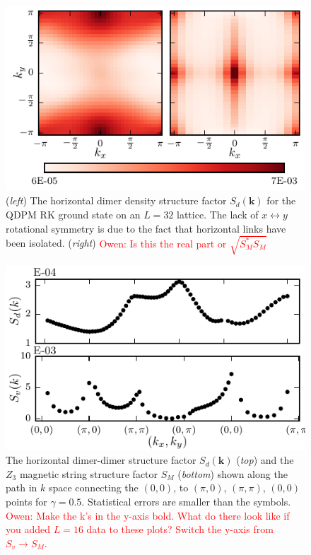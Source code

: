\documentclass[twocolumn,prb,aps,floatfix,superscriptaddress]{revtex4-1}
\newcommand{\note}[1]{\textcolor{red}{#1}}
\begin{document}
   \begin{figure}[]
        \centering
        \includegraphics[width=1.0\columnwidth]{qdpm_dmr_vis_HM_16x16.pdf}
        \caption{({\it left}) The horizontal dimer density structure factor $S_d(\bm{k})$ for the QDPM RK ground state on an $L=32$ lattice. The lack of $x\leftrightarrow y$ rotational symmetry is due to the fact that horizontal links have been isolated. ({\it right}) \note{Owen: Is this the real part or $\sqrt{S_M^* S_M}$}}
        \label{fig:structure_factor} 
    \end{figure}
    \begin{figure}[]
        \centering
        \includegraphics[width=1.0\columnwidth]{vis_dmr_qdpm_struc_fac_32x32.pdf}
        \caption{ The horizontal dimer-dimer structure factor $S_d(\bm{k})$ ({\it top}) and the $Z_3$ magnetic string structure factor $S_M$ ({\it bottom})
        shown along the path in $k$ space connecting the $(0,0)$, to $(\pi,0)$, $(\pi,\pi)$, $(0,0)$
        points for $\gamma=0.5$. Statistical errors are smaller than the symbols. \note{Owen: Make the k's in the y-axis bold. What do there look like if you added $L=16$ data to these plots? Switch the y-axis from $S_v\rightarrow S_M$.}}
        \label{fig:structure_factor_path}
    \end{figure}
\end{document}

